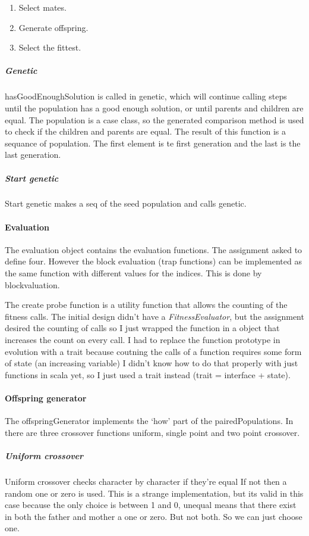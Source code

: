 \documentclass{article}
\begin{document}
\begin{empfile}
\begin{enumerate}
	\item Select mates.
	\item Generate offspring.
	\item Select the fittest.
\end{enumerate}

\subparagraph{Genetic} hasGoodEnoughSolution is called in genetic,
which will continue calling steps until the population has a good enough
solution, or until parents and children are equal.
The population is a case class, so the generated comparison method is used
to check if the children and parents are equal.
The result of this function is a sequance of population. The first element
is te first generation and the last is the last generation.

\subparagraph{Start genetic} Start genetic makes a seq of the seed population and
calls genetic.


\paragraph{Evaluation} The evaluation object
contains the evaluation functions. The assignment asked to define four.
However the block evaluation (trap functions) can be implemented as the
same function with different values for the indices. This is done by
blockvaluation.

The create probe function is a utility function that allows the counting of
the fitness calls. The initial design didn't have a \emph{FitnessEvaluator},
but the assignment desired the counting of calls so I just wrapped the
function in a object that increases the count on every call. I had to
replace the function prototype in evolution with a trait because coutning
the calls of a function requires some form of state (an increasing variable)
I didn't know how to do that properly with just functions in scala yet,
so I just used a trait instead (trait = interface + state).

\paragraph{Offspring generator} The offspringGenerator implements the `how'
part of the pairedPopulations.  In there are three crossover functions
uniform, single point and two point crossover.

\subparagraph{Uniform crossover}
Uniform crossover checks character by character if they're equal
If not then a random one or zero is used. This is a strange
implementation, but its valid in this case because the only choice is
between 1 and 0, unequal means that there exist in both the father and
mother a one or zero. But not both. So we can just choose one.


\end{empfile}
\end{document}
